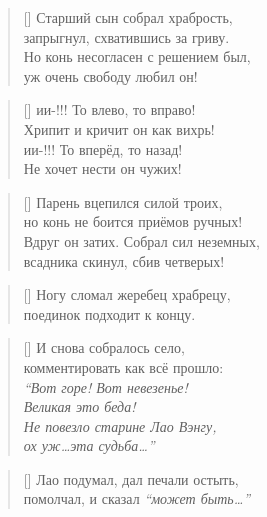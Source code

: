 \documentclass[14pt]{memoir}
\begin{document}
\begin{verse}[\versewidth]
Старший сын собрал храбрость, \\
запрыгнул, схватившись за гриву. \\
Но конь несогласен с решением был, \\
уж очень свободу любил он! \\
\end{verse}

\begin{verse}[\versewidth]
ии{}{}-{!!!} То влево, то вправо! \\
Хрипит и кричит он как вихрь! \\
ии{}{}-{!!!} То вперёд, то назад! \\
Не хочет нести он чужих! \\
\end{verse}

\begin{verse}[\versewidth]
Парень вцепился силой троих, \\
но конь не боится приёмов ручных! \\
Вдруг он затих. Собрал сил неземных,  \\
всадника скинул, сбив четверых! \\
\end{verse}

\begin{verse}[\versewidth]
Ногу сломал жеребец храбрецу, \\
поединок подходит к концу. \\
\end{verse}

\begin{verse}[\versewidth]
И снова собралось село, \\
комментировать как всё прошло: \\
\emph{``Вот горе! Вот невезенье! \\
Великая это беда! \\
Не повезло старине Лао Вэнгу, \\
ох уж\ldots эта судьба\ldots''} \\
\end{verse}

\begin{verse}[\versewidth]
Лао подумал, дал печали остыть, \\
помолчал, и сказал \emph{``может быть\ldots''} \\
\end{verse}
\end{document}
